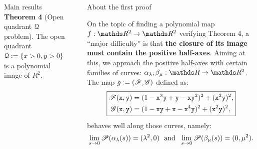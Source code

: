 \documentclass[final]{beamer}
\newlength{\sepwid}
\newlength{\onecolwid}
\newlength{\twocolwid}
\begin{document}
\begin{frame}[t]
\begin{columns}[t]
\begin{column}{\onecolwid}
\begin{block}{Main results}
\textbf{Theorem 4} (Open quadrant $\mathcal{Q}$ problem).
The open quadrant $\mathcal{Q}:=\{x>0,y>0\}$ is a polynomial image of $R^2$.


\end{block}
 
 
 
 
\end{column} %
 
\begin{column}{\sepwid}\end{column} %
 
\begin{column}{\twocolwid} %
 
\begin{columns}[t,totalwidth=\twocolwid] %
 
\begin{column}{\onecolwid}\vspace{-.6in} %
 
\vspace{-1cm}
 
\begin{block}{About the first proof}

On the topic of finding a polynomial map $f:\R^2\to\R^2$ verifying Theorem 4, a ``major difficulty''  is that 
\textbf{the closure of its image must contain the positive half-axes}. 
Aiming at this, we approach the positive half-axes with certain families of curves: 
$\alpha_{\lambda}, \beta_{\mu}: \R \to \R^2$. The map $g := (\mathscr{F}, \mathscr{G})$ defined as:
\begin{equation*}\label{eq:firstMap}
\boxed{
\begin{aligned}
\mathscr{F}({\tt x},{\tt y})&=(1-{\tt x}^3{\tt y}+{\tt y}-{\tt x}{\tt y}^2)^2+({\tt x}^2{\tt y})^2, \\
\mathscr{G}({\tt x},{\tt y})&=(1-{\tt x}{\tt y}+{\tt x}-{\tt x}^4{\tt y})^2+({\tt x}^2{\tt y})^2, \\
\end{aligned}
}
\end{equation*}
behaves well along those curves, namely:
$$
\lim_{s\rightarrow 0} \P(\alpha_{\lambda}(s))=(\lambda^2,0)\ \ \text{and}\ \ \lim_{s\rightarrow 0} \P(\beta_{\mu}(s))=(0,\mu^2).
$$



\end{block}
\end{column}
\end{columns}
\end{column}
\end{columns}
\end{frame}
\end{document}

